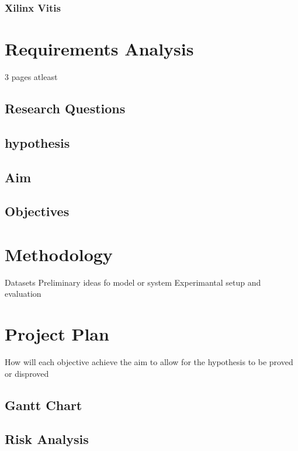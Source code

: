 \documentclass[12pt]{article}
\begin{document}
\subsubsection{Xilinx Vitis}

\section{Requirements Analysis}
3 pages atleast \cite{RN54}

\subsection{Research Questions}
\subsection{hypothesis}
\subsection{Aim}
\subsection{Objectives}

\section{Methodology}
Datasets
Preliminary ideas fo model or system
Experimantal setup and evaluation

\section{Project Plan}
How will each objective achieve the aim to allow for the hypothesis to be proved or disproved

\subsection{Gantt Chart}

\subsection{Risk Analysis}

\newpage


\end{document}
